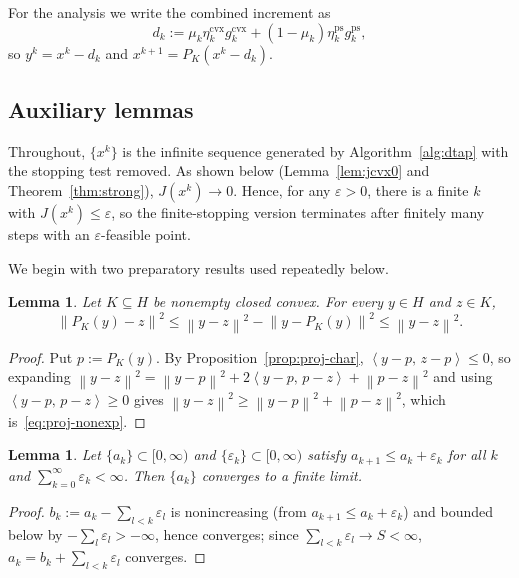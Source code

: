 \documentclass[]{interact}
\theoremstyle{plain}
\newtheorem{lemma}[theorem]{Lemma}
\theoremstyle{definition}
\theoremstyle{remark}
\newcommand{\norm}[1]{\left\lVert #1 \right\rVert}
\newcommand{\inner}[2]{\left\langle #1,\, #2 \right\rangle}
\newcommand{\cvx}{\mathrm{cvx}}
\newcommand{\ps}{\mathrm{ps}}
\begin{document}
For the analysis we write the combined increment as
\begin{equation}\label{eq:dk}
d_k:=\mu_k\eta^{\cvx}_k g^{\cvx}_k+(1-\mu_k)\eta^{\ps}_k g^{\ps}_k,
\end{equation}
so $y^k=x^k-d_k$ and $x^{k+1}=P_K(x^k-d_k)$.

\subsection{Auxiliary lemmas}\label{ssec:aux}
Throughout, $\{x^k\}$ is the infinite sequence generated by Algorithm~\ref{alg:dtap} with the stopping test removed. As shown below (Lemma~\ref{lem:jcvx0} and Theorem~\ref{thm:strong}), $J(x^k)\to 0$. Hence, for any $\varepsilon>0$, there is a finite $k$ with $J(x^k)\le\varepsilon$, so the finite-stopping version terminates after finitely many steps with an $\varepsilon$-feasible point.

We begin with two preparatory results used repeatedly below.

\begin{lemma}\label{lem:proj-nonexp}
Let $K\subseteq H$ be nonempty closed convex. For every $y\in H$ and $z\in K$,
\begin{equation}\label{eq:proj-nonexp}
\norm{P_K(y)-z}^2\le\norm{y-z}^2-\norm{y-P_K(y)}^2\le\norm{y-z}^2 .
\end{equation}
\end{lemma}
\begin{proof}
Put $p:=P_K(y)$. By Proposition~\ref{prop:proj-char}, $\inner{y-p}{z-p}\le0$, so expanding $\norm{y-z}^2=\norm{y-p}^2+2\inner{y-p}{p-z}+\norm{p-z}^2$ and using $\inner{y-p}{p-z}\ge0$ gives $\norm{y-z}^2\ge\norm{y-p}^2+\norm{p-z}^2$, which is~\eqref{eq:proj-nonexp}.
\end{proof}

\begin{lemma}\label{lem:seq}
Let $\{a_k\}\subset[0,\infty)$ and $\{\varepsilon_k\}\subset[0,\infty)$ satisfy $a_{k+1}\le a_k+\varepsilon_k$ for all $k$ and $\sum_{k=0}^\infty\varepsilon_k<\infty$. Then $\{a_k\}$ converges to a finite limit.
\end{lemma}
\begin{proof}
$b_k:=a_k-\sum_{l<k}\varepsilon_l$ is nonincreasing (from $a_{k+1}\le a_k+\varepsilon_k$) and bounded below by $-\sum_l\varepsilon_l>-\infty$, hence converges; since $\sum_{l<k}\varepsilon_l\to S<\infty$, $a_k=b_k+\sum_{l<k}\varepsilon_l$ converges.
\end{proof}
\end{document}
